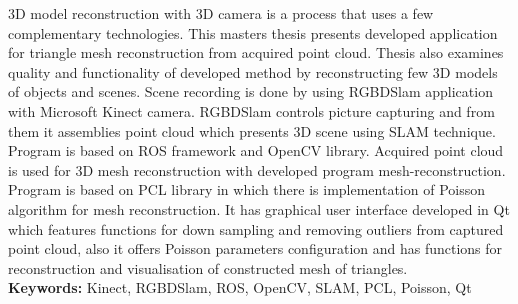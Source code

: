 3D model reconstruction with 3D camera is a process that uses a few
complementary technologies. This masters thesis presents developed
application for triangle mesh reconstruction from acquired point cloud.
Thesis also examines quality and functionality of developed method by
reconstructing few 3D models of objects and scenes. Scene recording is
done by using RGBDSlam application with Microsoft Kinect camera.
RGBDSlam controls picture capturing and from them it assemblies point
cloud which presents 3D scene using SLAM technique. Program is based on
ROS framework and OpenCV library. Acquired point cloud is used for
3D mesh reconstruction with developed program mesh-reconstruction.
Program is based on PCL library in which there is implementation of
Poisson algorithm for mesh reconstruction. It has graphical user
interface developed in Qt which features functions for down sampling and
removing outliers from captured point cloud, also it offers Poisson
parameters configuration and has functions for reconstruction and
visualisation of constructed mesh of triangles.  \\

\noindent\textbf{Keywords:} Kinect, RGBDSlam, ROS, OpenCV, SLAM, PCL,
Poisson, Qt

